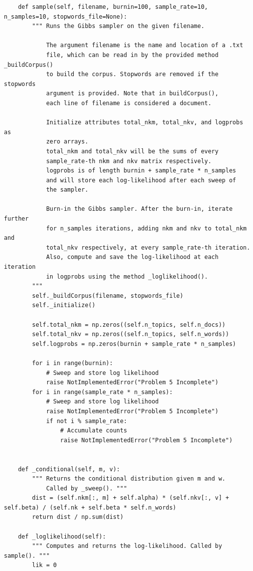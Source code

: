 \begin{lstlisting}
    def sample(self, filename, burnin=100, sample_rate=10, n_samples=10, stopwords_file=None):
        """ Runs the Gibbs sampler on the given filename.

            The argument filename is the name and location of a .txt
            file, which can be read in by the provided method _buildCorpus()
            to build the corpus. Stopwords are removed if the stopwords
            argument is provided. Note that in buildCorpus(),
            each line of filename is considered a document.

            Initialize attributes total_nkm, total_nkv, and logprobs as
            zero arrays.
            total_nkm and total_nkv will be the sums of every
            sample_rate-th nkm and nkv matrix respectively.
            logprobs is of length burnin + sample_rate * n_samples
            and will store each log-likelihood after each sweep of
            the sampler.

            Burn-in the Gibbs sampler. After the burn-in, iterate further
            for n_samples iterations, adding nkm and nkv to total_nkm and
            total_nkv respectively, at every sample_rate-th iteration.
            Also, compute and save the log-likelihood at each iteration
            in logprobs using the method _loglikelihood().
        """
        self._buildCorpus(filename, stopwords_file)
        self._initialize()

        self.total_nkm = np.zeros((self.n_topics, self.n_docs))
        self.total_nkv = np.zeros((self.n_topics, self.n_words))
        self.logprobs = np.zeros(burnin + sample_rate * n_samples)

        for i in range(burnin):
            # Sweep and store log likelihood
            raise NotImplementedError("Problem 5 Incomplete")
        for i in range(sample_rate * n_samples):
            # Sweep and store log likelihood
            raise NotImplementedError("Problem 5 Incomplete")
            if not i % sample_rate:
                # Accumulate counts
                raise NotImplementedError("Problem 5 Incomplete")


    def _conditional(self, m, v):
        """ Returns the conditional distribution given m and w.
            Called by _sweep(). """
        dist = (self.nkm[:, m] + self.alpha) * (self.nkv[:, v] + self.beta) / (self.nk + self.beta * self.n_words)
        return dist / np.sum(dist)

    def _loglikelihood(self):
        """ Computes and returns the log-likelihood. Called by sample(). """
        lik = 0


\end{lstlisting}
